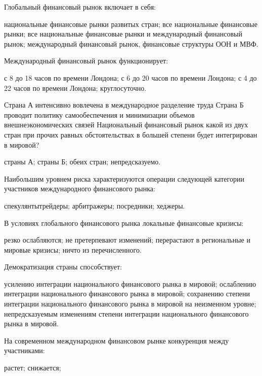 \documentclass[12pt, table]{exam}
\begin{document}
\begin{questions}
\begin{multicols}{2}
\question Глобальный финансовый рынок включает в себя:
	 \begin{choices}
	 \choice национальные финансовые рынки развитых стран;
	 \choice все национальные финансовые рынки;
	 \CC все национальные финансовые рынки и международный финансовый рынок;
	 \choice международный финансовый рынок, финансовые структуры ООН и МВФ.
	 \end{choices}
\question Международный финансовый рынок функционирует:
	 \begin{choices}
	 \choice с 8 до 18 часов по времени Лондона;
	 \choice с 6 до 20 часов по времени Лондона;
	 \choice с 4 до 22 часов по времени Лондона;
	 \CC круглосуточно.
	 \end{choices}
\question Страна А интенсивно вовлечена в международное разделение труда Страна Б проводит политику самообеспечения и минимизации объемов внешнеэкономических связей Национальный финансовый рынок какой из двух стран при прочих равных обстоятельствах в большей степени будет интегрирован в мировой?
	 \begin{choices}
	 \CC страны А;
	 \choice страны Б;
	 \choice обеих стран;
	 \choice непредсказуемо.
	 \end{choices}
\question Наибольшим уровнем риска характеризуются операции следующей категории участников международного финансового рынка:
	 \begin{choices}
	 \CC спекулянтытрейдеры;
	 \choice арбитражеры;
	 \choice посредники;
	 \choice хеджеры.
	 \end{choices}
\question В условиях глобального финансового рынка локальные финансовые кризисы:
	 \begin{choices}
	 \choice резко ослабляются;
	 \choice не претерпевают изменений;
	 \CC перерастают в региональные и мировые кризисы;
	 \choice ничто из перечисленного.
	 \end{choices}
\question Демократизация страны способствует:
	 \begin{choices}
	 \choice усилению интеграции национального финансового рынка в мировой;
	 \choice ослаблению интеграции национального финансового рынка в мировой;
	 \choice сохранению степени интеграции национального финансового рынка в мировой на неизменном уровне;
	 \CC непредсказуемым изменениям степени интеграции национального финансового рынка в мировой.
	 \end{choices}
\question На современном международном финансовом рынке конкуренция между участниками:
	 \begin{choices}
	 \CC растет;
	 \choice снижается;

\end{choices}
\end{multicols}
\end{questions}
\end{document}
